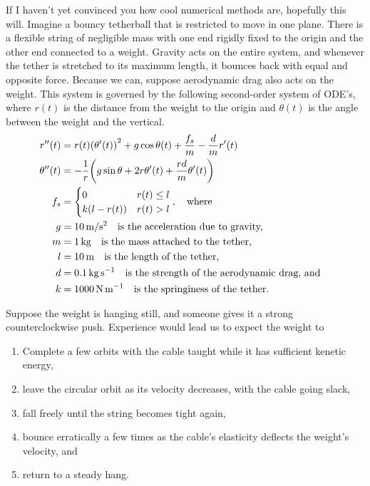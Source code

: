 \documentclass{article}
\newcommand{\0}{\vb{0}}
\begin{document}
If I haven't yet convinced you how cool numerical methods are, hopefully this will. Imagine a bouncy tetherball that is restricted to move in one plane. There is a flexible string of negligible mass with one end rigidly fixed to the origin and the other end connected to a weight. Gravity acts on the entire system, and whenever the tether is stretched to its maximum length, it bounces back with equal and opposite force. Because we can, suppose aerodynamic drag also acts on the weight. This system is governed by the following second-order system of ODE's, where $r(t)$ is the distance from the weight to the origin and $\theta(t)$ is the angle between the weight and the vertical.
\begin{align*}
  r''(t) & = r(t)\qty(\theta'(t))^2 + g\cos\theta(t) + \frac{f_s}{m} - \frac{d}{m}r'(t) \\
  \theta''(t) & = -\frac{1}{r}\qty(g\sin\theta + 2r\theta'(t) + \frac{rd}{m}\theta'(t)) \\
  f_s & = \begin{cases}
    0 & r(t) \leq l \\
    k(l - r(t)) & r(t) > l
  \end{cases}, \qq{where} \\
    g & = \SI{10}{\meter\per\second^2} \qq{is the acceleration due to gravity,} \\
    m & = \SI{1}{\kilo\gram} \qq{is the mass attached to the tether,} \\
    l & = \SI{10}{\meter} \qq{is the length of the tether,} \\
    d & = \SI{0.1}{\kilo\gram\per\second} \qq{is the strength of the aerodynamic drag, and} \\
    k & = \SI{1000}{\newton\per\meter} \qq{is the springiness of the tether.}
\end{align*}

Suppose the weight is hanging still, and someone gives it a strong counterclockwise push. Experience would lead us to expect the weight to
\begin{enumerate}
  \item Complete a few orbits with the cable taught while it has sufficient kenetic energy,
  \item leave the circular orbit as its velocity decreases, with the cable going slack,
  \item fall freely until the string becomes tight again,
  \item bounce erratically a few times as the cable's elasticity deflects the weight's velocity, and
  \item return to a steady hang.
\end{enumerate}
\end{document}
